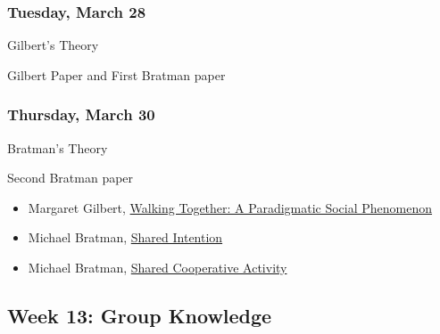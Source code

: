 \documentclass[
]{article}
\providecommand{\tightlist}{%
  \setlength{\itemsep}{0pt}\setlength{\parskip}{0pt}}
\begin{document}
\begin{multicols}{2}

\hypertarget{tuesday-march-28}{%
\subsubsection{Tuesday, March 28}\label{tuesday-march-28}}

\begin{description}
\tightlist
\item[Topic]
Gilbert's Theory
\item[Reading]
Gilbert Paper and First Bratman paper
\end{description}

\hypertarget{thursday-march-30}{%
\subsubsection{Thursday, March 30}\label{thursday-march-30}}

\begin{description}
\tightlist
\item[Topic]
Bratman's Theory
\item[Reading]
Second Bratman paper
\end{description}

\end{multicols}

\begin{itemize}
\tightlist
\item
  Margaret Gilbert, \href{https://philpapers.org/rec/GILWTA}{Walking
  Together: A Paradigmatic Social Phenomenon}
\item
  Michael Bratman, \href{https://philpapers.org/rec/BRASI}{Shared
  Intention}
\item
  Michael Bratman, \href{https://philpapers.org/rec/BRASCA}{Shared
  Cooperative Activity}
\end{itemize}

\hypertarget{week-13-group-knowledge}{%
\subsection{Week 13: Group Knowledge}\label{week-13-group-knowledge}}
\end{document}
